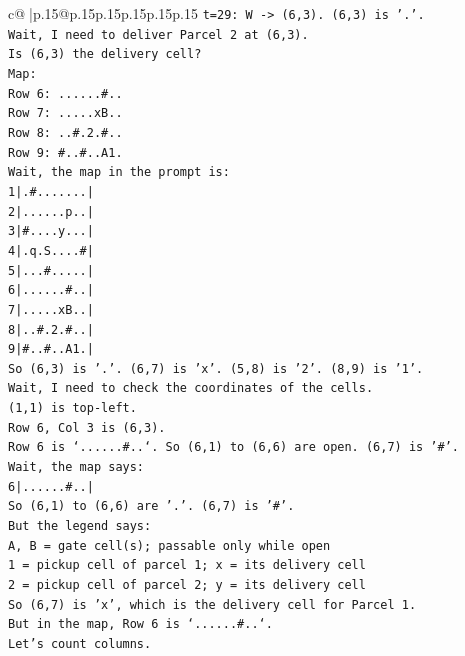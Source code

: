 \documentclass{article}
\begin{document}
{\begin{supertabular}{c@{$\;$}|p{.15\linewidth}@{}p{.15\linewidth}p{.15\linewidth}p{.15\linewidth}p{.15\linewidth}p{.15\linewidth}}
{{{\texttt{t=29: W {-}> (6,3). (6,3) is '.'.} \\
\texttt{Wait, I need to deliver Parcel 2 at (6,3).} \\
\texttt{Is (6,3) the delivery cell?} \\
\texttt{Map:} \\
\texttt{Row 6: ......\#..} \\
\texttt{Row 7: .....xB..} \\
\texttt{Row 8: ..\#.2.\#..} \\
\texttt{Row 9: \#..\#..A1.} \\
\texttt{Wait, the map in the prompt is:} \\
\texttt{1|.\#.......|} \\
\texttt{2|......p..|} \\
\texttt{3|\#....y...|} \\
\texttt{4|.q.S....\#|} \\
\texttt{5|...\#.....|} \\
\texttt{6|......\#..|} \\
\texttt{7|.....xB..|} \\
\texttt{8|..\#.2.\#..|} \\
\texttt{9|\#..\#..A1.|} \\
\texttt{So (6,3) is '.'. (6,7) is 'x'. (5,8) is '2'. (8,9) is '1'.} \\
\texttt{Wait, I need to check the coordinates of the cells.} \\
\texttt{(1,1) is top{-}left.} \\
\texttt{Row 6, Col 3 is (6,3).} \\
\texttt{Row 6 is `......\#..`. So (6,1) to (6,6) are open. (6,7) is '\#'.} \\
\texttt{Wait, the map says:} \\
\texttt{6|......\#..|} \\
\texttt{So (6,1) to (6,6) are '.'. (6,7) is '\#'.} \\
\texttt{But the legend says:} \\
\texttt{A, B = gate cell(s); passable only while open} \\
\texttt{1 = pickup cell of parcel 1; x = its delivery cell} \\
\texttt{2 = pickup cell of parcel 2; y = its delivery cell} \\
\texttt{So (6,7) is 'x', which is the delivery cell for Parcel 1.} \\
\texttt{But in the map, Row 6 is `......\#..`.} \\
\texttt{Let's count columns.} \\
}}}
\end{supertabular}}
\end{document}
